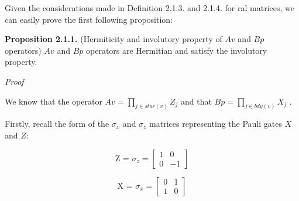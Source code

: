 \documentclass[12pt]{report}
\begin{document}
\begin{minipage}{1\textwidth}
		Given the considerations made in Definition 2.1.3. and 2.1.4. for ral matrices, we can easily prove the first following proposition: \newline
		
		\textbf{Proposition 2.1.1.} (Hermiticity and involutory property of $Av$ and $Bp$ operators)
		$Av$ and $Bp$ operators are Hermitian and satisfy the involutory property.\newline
		
		\textit{Proof}\newline
		
		We know that the operator $ Av = \prod_{j \in star(v)} Z_j $ and that $ Bp = \prod_{j \in bdy(v)} X_j $ .\newline
		
		Firstly, recall the form of the $\sigma_x$ and $\sigma_z$ matrices representing the Pauli gates $X$ and $Z$:
		
		
		
		\[
		\text{Z = $\sigma_z$} =
		\begin{bmatrix}
			1 & 0 \\
			0 & -1
		\end{bmatrix}
		\]
		
		
		\[
		\text{X = $\sigma_x$} =
		\begin{bmatrix}
			0 & 1 \\
			1 & 0
		\end{bmatrix}
		\]
		
		
	\end{minipage}  
	
\end{document}
